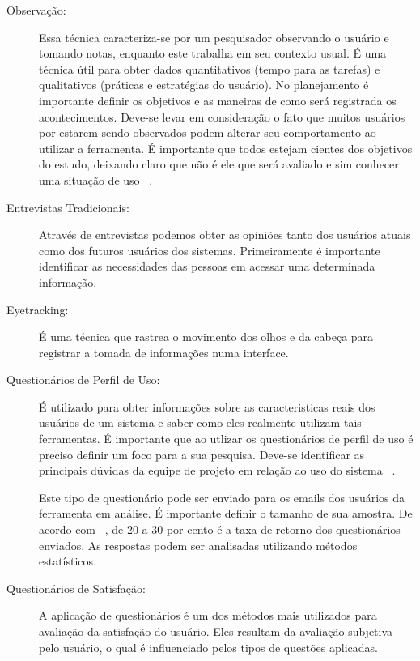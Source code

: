 \begin{description}

\item[Observação:]

	Essa técnica caracteriza-se por um pesquisador observando o usuário e tomando notas, enquanto este trabalha em seu contexto usual. É uma técnica útil para obter dados quantitativos (tempo para as tarefas) e qualitativos (práticas e estratégias do usuário). No planejamento é importante definir os objetivos e as maneiras de como será registrada os acontecimentos. Deve-se levar em consideração o fato que muitos usuários por estarem sendo observados podem alterar seu comportamento ao utilizar a ferramenta. É importante que todos estejam cientes dos objetivos do estudo, deixando claro que não é ele que será avaliado e sim conhecer uma situação de uso ~\cite{cybis2010}.

\item[Entrevistas Tradicionais:]

Através de entrevistas podemos obter as opiniões tanto dos usuários atuais como dos futuros usuários dos sistemas. Primeiramente é importante identificar as necessidades das pessoas em acessar uma determinada informação.

\item[Eyetracking:]

É uma técnica que rastrea o movimento dos olhos e da cabeça para registrar a tomada de informações numa interface.

\item[Questionários de Perfil de Uso:]
 
É utilizado para obter informações sobre as caracteristicas reais dos usuários de um sistema e saber como eles realmente utilizam tais ferramentas. É importante que ao utlizar os questionários de perfil de uso é preciso definir um foco para a sua pesquisa. Deve-se identificar as principais dúvidas da equipe de projeto em relação ao uso do sistema ~\cite{cybis2010}.

Este tipo de questionário pode ser enviado para os emails dos usuários da ferramenta em análise. É importante definir o tamanho de sua amostra. De acordo com ~, de 20 a 30 por cento é a taxa de retorno dos questionários enviados. As respostas podem ser analisadas utilizando métodos estatísticos.


\item[Questionários de Satisfação:]

	A aplicação de questionários é um dos métodos mais utilizados para avaliação da satisfação do usuário. Eles resultam da avaliação subjetiva pelo usuário, o qual é influenciado pelos tipos de questões aplicadas.
	

\end{description}
